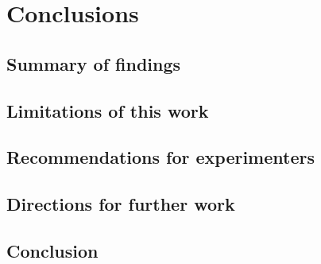 \chapter{Conclusions}
\label{ch:conclusions}

\section{Summary of findings}




\section{Limitations of this work}

\section{Recommendations for experimenters}

\section{Directions for further work}

\section{Conclusion}
